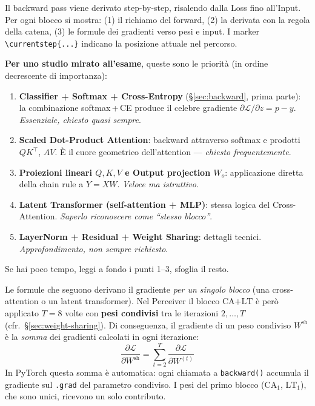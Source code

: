 \documentclass[
  11pt,
]{article}
\begin{document}
\begin{notabox}[title={\textbf{Struttura di questa sezione e priorità di studio}}]
Il backward pass viene derivato step-by-step, risalendo dalla Loss fino all'Input. Per ogni blocco si mostra: (1) il richiamo del forward, (2) la derivata con la regola della catena, (3) le formule dei gradienti verso pesi e input. I marker \texttt{\textbackslash currentstep\{...\}} indicano la posizione attuale nel percorso.

\medskip\textbf{Per uno studio mirato all'esame}, queste sono le priorità (in ordine decrescente di importanza):
\begin{enumerate}\setlength\itemsep{0.15em}
\item \textbf{Classifier + Softmax + Cross-Entropy} (\S\ref{sec:backward}, prima parte): la combinazione softmax\,+\,CE produce il celebre gradiente $\partial\mathcal{L}/\partial z = p - y$. \emph{Essenziale, chiesto quasi sempre}.
\item \textbf{Scaled Dot-Product Attention}: backward attraverso softmax e prodotti $QK^\top$, $AV$. È il cuore geometrico dell'attention --- \emph{chiesto frequentemente}.
\item \textbf{Proiezioni lineari $Q, K, V$ e Output projection $W_o$}: applicazione diretta della chain rule a $Y = XW$. \emph{Veloce ma istruttivo}.
\item \textbf{Latent Transformer (self-attention + MLP)}: stessa logica del Cross-Attention. \emph{Saperlo riconoscere come ``stesso blocco''}.
\item \textbf{LayerNorm + Residual + Weight Sharing}: dettagli tecnici. \emph{Approfondimento, non sempre richiesto}.
\end{enumerate}

Se hai poco tempo, leggi a fondo i punti 1--3, sfoglia il resto.
\end{notabox}

\begin{notabox}[title={\textbf{Nota sul weight sharing nel backward}}]
Le formule che seguono derivano il gradiente \emph{per un singolo blocco} (una cross-attention o un latent transformer). Nel Perceiver il blocco $\text{CA+LT}$ è però applicato $T = 8$ volte con \textbf{pesi condivisi} tra le iterazioni $2, \ldots, T$ (cfr.\ \S\ref{sec:weight-sharing}). Di conseguenza, il gradiente di un peso condiviso $W^{\text{sh}}$ è la \emph{somma} dei gradienti calcolati in ogni iterazione:
\[
\frac{\partial \mathcal{L}}{\partial W^{\text{sh}}} = \sum_{t=2}^{T} \frac{\partial \mathcal{L}}{\partial W^{(t)}}
\]
In PyTorch questa somma è automatica: ogni chiamata a \texttt{backward()} accumula il gradiente sul \texttt{.grad} del parametro condiviso. I pesi del primo blocco ($\text{CA}_1$, $\text{LT}_1$), che sono unici, ricevono un solo contributo.
\end{notabox}
\end{document}
